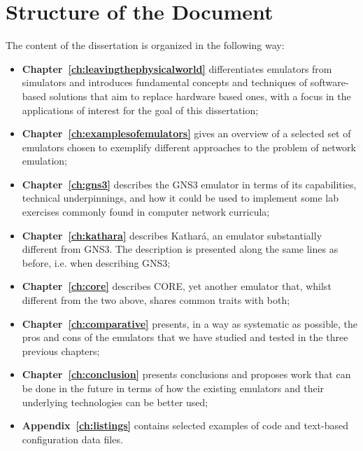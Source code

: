 \section{Structure of the Document}
\label{sec:structure}

The content of the dissertation is organized in the following way:
\begin{itemize}
  \item \textbf{Chapter~\ref{ch:leavingthephysicalworld}} differentiates emulators from simulators and introduces fundamental concepts and techniques of software-based solutions that aim to replace hardware based ones, with a focus in the applications of interest for the goal of this dissertation;
  \item \textbf{Chapter~\ref{ch:examplesofemulators}} gives an overview of a selected set of emulators chosen to exemplify different approaches to the problem of network emulation;
  \item \textbf{Chapter~\ref{ch:gns3}} describes the GNS3 emulator in terms of its capabilities, technical underpinnings, and how it could be used to implement some lab exercises commonly found in computer network curricula;
  \item \textbf{Chapter~\ref{ch:kathara}} describes Kathará, an emulator substantially different from GNS3. The description is presented along the same lines as before, i.e. when describing GNS3;
  \item \textbf{Chapter~\ref{ch:core}} describes CORE, yet another emulator that, whilst different from the two above, shares common traits with both;
  \item \textbf{Chapter~\ref{ch:comparative}} presents, in a way as systematic as possible, the pros and cons of the emulators that we have studied and tested in the three previous chapters;
  \item \textbf{Chapter~\ref{ch:conclusion}} presents conclusions and proposes work that can be done in the future in terms of how the existing emulators and their underlying technologies can be better used;
  \item \textbf{Appendix~\ref{ch:listings}} contains selected examples of code and text-based configuration data files.
\end{itemize}

